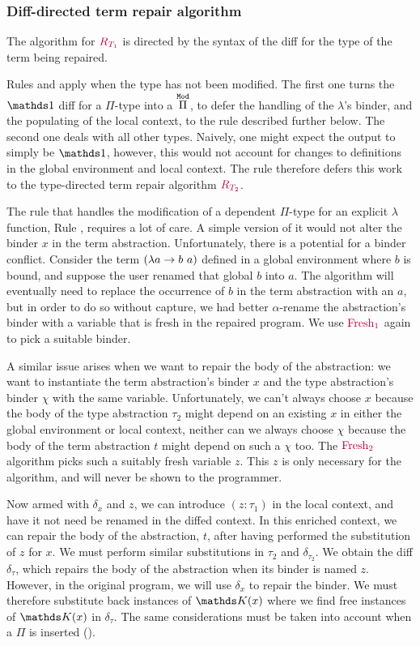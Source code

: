 \subsubsection*{Diff-directed term repair algorithm}

The algorithm for $\textcolor{purple}{R_{T_1}}$ is directed by the syntax of the diff for
the type of the term being repaired.

Rules  and  apply when the type has not
been modified.  The first one turns the $\MathSame$ diff for a $\Pi$-type into a
$\overset{\mathtt{Mod}}{\Pi}$, to defer the handling of the $\lambda$'s binder, and the
populating of the local context, to the rule  described
further below.  The second one deals with all other types.  Naively, one might
expect the output to simply be $\MathSame$, however, this would not account for
changes to definitions in the global environment and local context.  The rule
therefore defers this work to the type-directed term repair algorithm
$\textcolor{purple}{R_{T_2}}$.

The rule that handles the modification of a dependent $\Pi$-type for an explicit
$\lambda$ function, Rule , requires a lot of care.  A simple
version of it would not alter the binder $x$ in the term abstraction.
Unfortunately, there is a potential for a binder conflict.  Consider the term
$({\lambda} {a} \rightarrow b\ a)$ defined in a global environment where $b$ is bound, and
suppose the user renamed that global $b$ into $a$.  The algorithm will
eventually need to replace the occurrence of $b$ in the term abstraction with an
$a$, but in order to do so without capture, we had better $\alpha$-rename the
abstraction's binder with a variable that is fresh in the repaired program.  We
use $\textcolor{purple}{\text{Fresh}_1}$ again to pick a suitable binder.

A similar issue arises when we want to repair the body of the abstraction: we
want to instantiate the term abstraction's binder $x$ and the type abstraction's
binder $\chi$ with the same variable.  Unfortunately, we can't always choose $x$
because the body of the type abstraction $\tau_2$ might depend on an existing
$x$ in either the global environment or local context, neither can we always
choose $\chi$ because the body of the term abstraction $t$ might depend on such
a $\chi$ too.  The $\textcolor{purple}{\text{Fresh}_2}$ algorithm picks such a suitably fresh variable
$z$.  This $z$ is only necessary for the algorithm, and will never be shown to
the programmer.

Now armed with $\delta_x$ and $z$, we can introduce $(z : \tau_1)$ in the local
context, and have it not need be renamed in the diffed context.  In this
enriched context, we can repair the body of the abstraction, $t$, after having
performed the substitution of $z$ for $x$.  We must perform similar
substitutions in $\tau_2$ and $\delta_{\tau_2}$.  We obtain the diff
$\delta_\tau$, which repairs the body of the abstraction when its binder is
named $z$.  However, in the original program, we will use $\delta_x$ to repair
the binder.  We must therefore substitute back instances of $\MathReplace{x}$
where we find free instances of $\MathReplace{x}$ in $\delta_\tau$.  The same
considerations must be taken into account when a $\Pi$ is inserted
().

